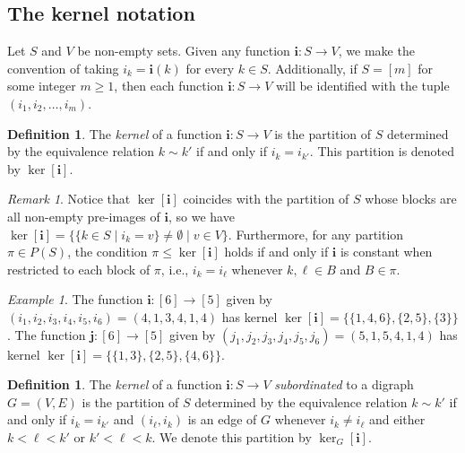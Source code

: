 \documentclass[a4paper,12pt]{extarticle}
\theoremstyle{definition}
\newtheorem{defn}[thm]{Definition}
\theoremstyle{remark}
\newtheorem{rem}[thm]{Remark}
\newtheorem{exa}[thm]{Example}
\begin{document}
\subsection{The kernel notation}

Let $S$ and $V$ be non-empty sets. 
%
Given any function $\bm{i}: S \rightarrow V$,  we make the convention of taking $i_{k} = \bm{i}(k)$ for every $k \in S$.  
%
Additionally, if  $S = [ m]  $ for some integer $m \geq 1$, then each function  $\bm{i}:  S \rightarrow V$ will be identified with the tuple $(i_{1},i_{2},\ldots,i_{m})$. 
%
%
%
%



\begin{defn} 
%
The \emph{kernel} of a function $\bm{i} : S \rightarrow V$ is the partition of $S$ determined by the equivalence relation $k \sim {k'}$ if and only if $i_k = i_{k'}$. 
%
This partition is denoted by $\ker[\bm{i}]$.
%
\end{defn}


\begin{rem}
%
Notice that $\ker[\bm{i}]$ coincides with the partition of $S$ whose blocks are all non-empty pre-images of $\bm{i}$, so we have   
%
$\ker[\bm{i}] = \{ \{k \in S \mid i_k = v \} \neq \emptyset \mid v \in V  \}$. 
%
Furthermore, for any partition $\pi \in P(S)$, the condition $\pi \leq \ker[\bm{i}]$ holds if and only if $\bm{i}$ is constant when restricted to each block of $\pi$, i.e., $i_{k} = i_{\ell}$ whenever $k,\ell \in B$ and $B \in \pi$.  
%
\end{rem}

 
\begin{exa} 
%
The function $\bm{i}:[6] \rightarrow [5]$ given by $ (i_{1},i_{2},i_{3},i_{4},i_{5},i_{6}) = (4,1,3,4,1,4)$ has kernel $\ker[\bm{i}] = \{\{1,4,6\},\{2,5\},\{3\}\}$. 
%
The function $\bm{j}:[6] \rightarrow [5]$ given by $ (j_{1},j_{2},j_{3},j_{4},j_{5},j_{6}) = (5,1,5,4,1,4)$ has kernel $\ker[\bm{i}] = \{\{1,3\},\{2,5\},\{4,6\}\}$. 
%
%
\end{exa} 
%
%
%
%

\begin{defn}\label{kerG} 
The \emph{kernel} of a function $\bm{i} : S \rightarrow V$ \emph{subordinated} to a digraph $G =(V,E)$ is the partition of $S$ determined by the equivalence relation $k \sim k'$ if and only if $i_k = i_{k'}$ 
and $(i_\ell,i_k)$ is an edge of $G$ whenever $i_k \neq i_\ell$ and either $k < \ell < k'$ or $k' < \ell < k$.
%
We denote this partition by $\ker_G[\bm{i}]$.
%
\end{defn}
\end{document}
